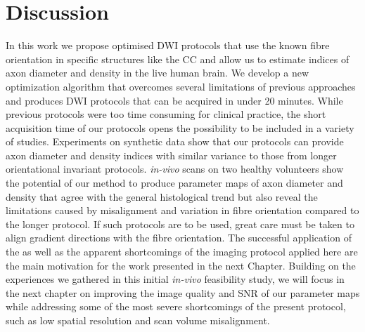 \section{Discussion}
In this work we propose optimised {\gls{DWI}} protocols that use the known fibre orientation in specific structures like the \gls{CC} and allow us to estimate indices of axon diameter and density in the live human brain. We develop a new optimization algorithm that overcomes several limitations of previous approaches and produces DWI protocols that can be acquired in under 20 minutes. While previous protocols were too time consuming for clinical practice, the short acquisition time of our protocols opens the possibility to be included in a variety of studies. Experiments on synthetic data show that our protocols can provide axon diameter and density indices with similar variance to those from longer orientational invariant protocols. \emph{in-vivo} scans on two healthy volunteers show the potential of our method to produce parameter maps of axon diameter and density that agree with the general histological trend but also reveal the limitations caused by misalignment and variation in fibre orientation compared to the longer {\OI} protocol. If such protocols are to be used, great care must be taken to align gradient directions with the fibre orientation. The successful application of the {\SF} as well as the apparent shortcomings of the imaging protocol applied here are the main motivation for the work presented in the next Chapter. Building on the experiences we gathered in this initial \emph{in-vivo} feasibility study, we will focus in the next chapter on improving the image quality and \gls{SNR} of our parameter maps while addressing some of the most severe shortcomings of the present protocol, such as low spatial resolution and scan volume misalignment.

